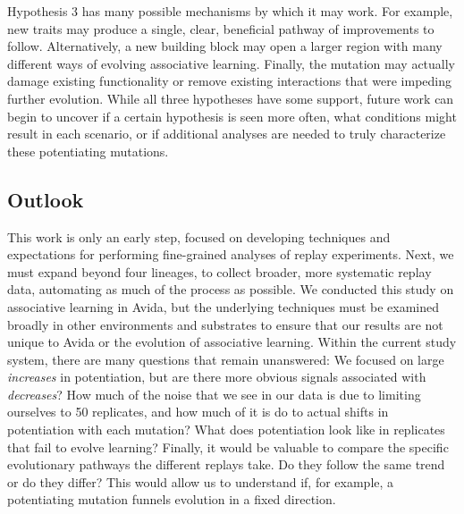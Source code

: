 Hypothesis 3 has many possible mechanisms by which it may work.  
For example, new traits may produce a single, clear, beneficial pathway of improvements to follow.  
Alternatively, a new building block may open a larger region with many different ways of evolving associative learning.
Finally, the mutation may actually damage existing functionality or remove existing interactions that were impeding further evolution.
While all three hypotheses have some support, future work can begin to uncover if a certain hypothesis is seen more often, what conditions might result in each scenario, or if additional analyses are needed to truly characterize these potentiating mutations. 


\subsection{Outlook}
This work is only an early step, focused on developing techniques and expectations for performing fine-grained analyses of replay experiments. 
Next, we must expand beyond four lineages, to collect broader, more systematic replay data, automating as much of the process as possible.
We conducted this study on associative learning in Avida, but the underlying techniques must be examined broadly in other environments and substrates to ensure that our results are not unique to Avida or the evolution of associative learning. %
Within the current study system, there are many questions that remain unanswered: 
We focused on large \textit{increases} in potentiation, but are there more obvious signals associated with \textit{decreases}?
How much of the noise that we see in our data is due to limiting ourselves to 50 replicates, and how much of it is do to actual shifts in potentiation with each mutation? %
What does potentiation look like in replicates that fail to evolve learning? %
Finally, it would be valuable to compare the specific evolutionary pathways the different replays take. Do they follow the same trend or do they differ?  This would allow us to understand if, for example, a potentiating mutation funnels evolution in a fixed direction.

